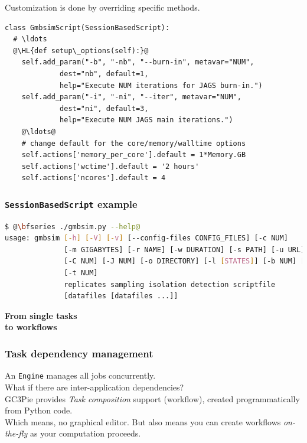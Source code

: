 \documentclass[english,serif,mathserif,xcolor=pdftex,dvipsnames,table]{beamer}
\begin{document}
\begin{frame}[fragile]
  \begin{center}
    Customization is done by overriding specific methods.
  \end{center}
  \begin{lstlisting}[showstringspaces=false,basicstyle=\tiny\ttfamily]
class GmbsimScript(SessionBasedScript):
  # \ldots
  @\HL{def setup\_options(self):}@
    self.add_param("-b", "-nb", "--burn-in", metavar="NUM",
             dest="nb", default=1,
             help="Execute NUM iterations for JAGS burn-in.")
    self.add_param("-i", "-ni", "--iter", metavar="NUM",
             dest="ni", default=3,
             help="Execute NUM JAGS main iterations.")
    @\ldots@
    # change default for the core/memory/walltime options
    self.actions['memory_per_core'].default = 1*Memory.GB
    self.actions['wctime'].default = '2 hours'
    self.actions['ncores'].default = 4
  \end{lstlisting}
\end{frame}


\begin{frame}[fragile]
  \frametitle{\texttt{SessionBasedScript} example}
\begin{lstlisting}[language=sh,basicstyle=\tiny\ttfamily]
$ @\bfseries ./gmbsim.py --help@
usage: gmbsim [-h] [-V] [-v] [--config-files CONFIG_FILES] [-c NUM]
              [-m GIGABYTES] [-r NAME] [-w DURATION] [-s PATH] [-u URL] [-N]
              [-C NUM] [-J NUM] [-o DIRECTORY] [-l [STATES]] [-b NUM] [-i NUM]
              [-t NUM]
              replicates sampling isolation detection scriptfile
              [datafiles [datafiles ...]]
\end{lstlisting}%
\end{frame}


\begin{frame}
  \begin{center}
    \bfseries\huge
    {From single tasks \\ to workflows}
  \end{center}
\end{frame}


\begin{frame}
\frametitle{Task dependency management}
\begin{center}
    An \texttt{Engine} manages all jobs concurrently. \\
    What if there are inter-application dependencies?
    \\ \+
    GC3Pie provides {\em Task composition} support (workflow), created
    programmatically from Python code.
    \\ \+
    Which means, no graphical editor.  But also means you can create
    workflows {\em on-the-fly} as your computation proceeds.
\end{center}
\end{frame}
\end{document}
